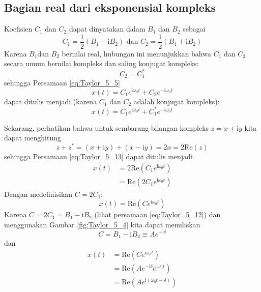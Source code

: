 \subsection*{Bagian real dari eksponensial kompleks}

Koefisien $C_1$ dan $C_2$ dapat dinyatakan dalam $B_1$ dan $B_2$ sebagai
\begin{equation}
C_{1} = \frac{1}{2}(B_{1} - \mathrm{i}B_{2}) \text{ dan }
C_{2} = \frac{1}{2}(B_{1} + \mathrm{i}B_{2})
\label{eq:Taylor_5_12}
\end{equation}
Karena $B_{1}$dan $B_{2}$ bernilai real, hubungan ini menunjukkan bahwa
$C_{1}$ dan $C_{2}$ secara umum bernilai kompleks dan saling konjugat kompleks:
\begin{equation*}
C_{2} = C_{1}^{*}
\end{equation*}
sehingga Persamaan \eqref{eq:Taylor_5_5}
\begin{equation*}
x(t) = C_{1}e^{\mathrm{i}\omega_0 t} + C_{2}e^{-\mathrm{i}\omega_0 t}
\end{equation*}
dapat ditulis menjadi (karena $C_1$ dan $C_2$ adalah konjugat kompleks):
\begin{equation}
x(t) = C_{1}e^{\mathrm{i}\omega_0 t} + C_{1}^{*}e^{-\mathrm{i}\omega_0 t}
\label{eq:Taylor_5_13}
\end{equation}

Sekarang, perhatikan bahwa untuk sembarang bilangan kompleks $z = x + \mathrm{i}y$
kita dapat menghitung
\begin{equation*}
z + z^{*} = (x + \mathrm{i}y) + (x - \mathrm{i}y) = 2x = 2\mathrm{Re}(z)
\end{equation*}
sehingga Persamaan \eqref{eq:Taylor_5_13} dapat ditulis menjadi
\begin{align*}
x(t) & = 2\mathrm{Re}\left(C_{1}e^{\mathrm{i}\omega_0 t} \right) \\
     & = \mathrm{Re}\left(2C_{1}e^{\mathrm{i}\omega_0 t} \right)
\end{align*}
Dengan medefinisikan $C = 2C_{1}$:
\begin{equation*}
x(t) = \mathrm{Re}\left(C e^{\mathrm{\mathrm{i}}\omega_0 t}\right)
\end{equation*}
Karena $C = 2C_1 = B_1 - \mathrm{i}B_2$ (lihat persamaan \eqref{eq:Taylor_5_12})
dan menggunakan Gambar \ref{fig:Taylor_5_4} kita dapat menuliskan
\begin{equation}
C = B_1 - \mathrm{i}B_2 \equiv A e^{-\mathrm{i}\delta}
\end{equation}
dan
\begin{align*}
x(t) & = \mathrm{Re}\left(Ce^{\mathrm{\mathrm{i}}\omega_{0} t}\right) \\
 & = \mathrm{Re}\left(Ae^{\mathrm{-i}\delta}e^{\mathrm{i}\omega_{0} t} \right) \\
 & = \mathrm{Re}\left(Ae^{\mathrm{i}(\omega_{0} t-\delta)}\right)
\end{align*}

